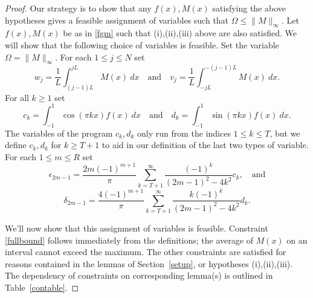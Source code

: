 \documentclass[12pt]{article}
\numberwithin{equation}{section}
\begin{document}
\begin{proof} Our strategy is to show that any $f(x),M(x)$ satisfying the above hypotheses gives a feasible assignment of variables such that $\Omega \leq \| M \|_{\infty}$. Let $f(x),M(x)$ be as in \eqref{fgm} such that (i),(ii),(iii) above are also satisfied. We will show that the following choice of variables is feasible. Set the variable $\Omega = \|M\|_{\infty}$. For each $1 \leq j \leq N$ set 
\[ w_j = \frac{1}{L} \int_{(j-1)L}^{jL} M(x) \ dx\quad \text{and} \quad v_j = \frac{1}{L} \int_{-jL}^{-(j-1)L} M(x) \ dx.\]
For all $k \geq 1$ set
\begin{equation}\label{ckdkdef} c_k = \int_{-1}^1 \cos(\pi kx ) f(x) \ dx \quad \text{and} \quad d_k =  \int_{-1}^1 \sin(\pi k x) f(x) \ dx.\end{equation}
The variables of the program $c_k,d_k$ only run from the indices $1 \leq k \leq T$, but we define $c_k,d_k$ for $k \geq T+1$ to aid in our definition of the last two types of variable. For each $1 \leq m \leq R$ set 
\[ \epsilon_{2m-1} = \frac{2m (-1)^{m+1}}{\pi} \sum_{k=T+1}^\infty \frac{(-1)^k}{(2m-1)^2-4k^2} c_k, \quad \text{and} \]
\[ \delta_{2m-1} = \frac{4(-1)^{m+1}}{\pi} \sum_{k=T+1}^\infty \frac{k(-1)^k }{(2m-1)^2-4k^2} d_k.\]

We'll now show that this assignment of variables is feasible. Constraint \eqref{fullbound} follows immediately from the definitions; the average of $M(x)$ on an interval cannot exceed the maximum. The other constraints are satisfied for reasons contained in the lemmas of Section~\ref{setup}, or hypotheses (i),(ii),(iii). The dependency of constraints on corresponding lemma(s) is outlined in Table~\ref{contable}. 


\end{proof}
\end{document}
